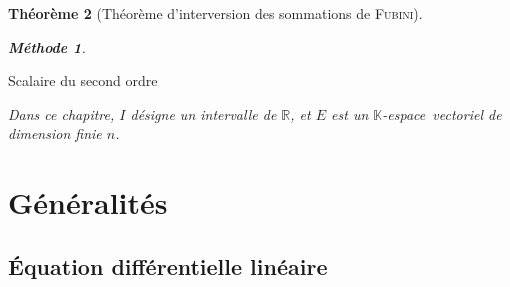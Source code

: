 \documentclass[11pt,a4paper]{report}
\newtheorem{theorem}{Théorème}[chapter]
\theoremstyle{definition}
\newtheorem{methode}[theorem]{Méthode}
\begin{document}
\begin{theorem}[Théorème d'interversion des sommations de \textsc{Fubini}]
{{\begin{methode}
\begin{description}
    \item[Scalaire du second ordre]
\end{description}

\end{methode}
Dans ce chapitre, $I$ désigne un intervalle de $\ensuremath{\mathbb{R}}$, et $E$ est un $\mathbb{K}$-espace~vectoriel \emph{de dimension finie} $n$.
\section{Généralités} %
\label{sec:ED_generalites}
\subsection{Équation différentielle linéaire} %
\label{sub:equa_diff_lineaire}

}}
\end{theorem}
\end{document}
